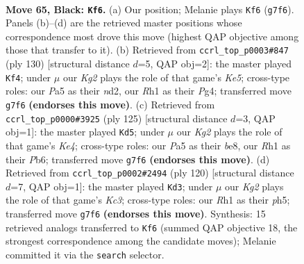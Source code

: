 \documentclass[11pt]{article}
\begin{document}
\clearpage

\begin{figure}[p]\centering
\begin{subfigure}{0.46\textwidth}\centering
\resizebox{\linewidth}{!}{%
\newchessgame
\chessboard[
  setfen={8/6k1/2p5/p2p4/8/4K3/8/7r b - - 1 65},
  showmover=false,
  pgfstyle=straightmove, color=movearrow, markmove={g7-f6}
]}
\caption{}
\end{subfigure}\hfill
\begin{subfigure}{0.46\textwidth}\centering
\resizebox{\linewidth}{!}{%
\newchessgame
\chessboard[
  setfen={8/5k2/8/4K1P1/6PP/8/3n4/8 w - - 5 66},
  showmover=false,
  pgfstyle=straightmove, color=movearrow, markmove={e5-f4}
]}
\caption{}
\end{subfigure}
\\[4pt]
\begin{subfigure}{0.46\textwidth}\centering
\resizebox{\linewidth}{!}{%
\newchessgame
\chessboard[
  setfen={4B3/8/1p6/4k1p1/7p/8/6K1/8 b - - 1 63},
  showmover=false,
  pgfstyle=straightmove, color=movearrow, markmove={e5-d5}
]}
\caption{}
\end{subfigure}\hfill
\begin{subfigure}{0.46\textwidth}\centering
\resizebox{\linewidth}{!}{%
\newchessgame
\chessboard[
  setfen={8/4k3/8/5pPp/7P/2K5/8/8 w - - 1 61},
  showmover=false,
  pgfstyle=straightmove, color=movearrow, markmove={c3-d3}
]}
\caption{}
\end{subfigure}
\caption{\textbf{Move 65, Black: \texttt{Kf6}.} (a) Our position; Melanie plays \texttt{Kf6} (\texttt{g7f6}). Panels (b)--(d) are the retrieved master positions whose correspondence most drove this move (highest QAP objective among those that transfer to it). (b) Retrieved from \texttt{ccrl\_top\_p0003\#847} (ply 130) [structural distance $d$=5, QAP obj=2]: the master played \texttt{Kf4}; under $\mu$ our \emph{Kg2} plays the role of that game's \emph{Ke5}; cross-type roles: our \emph{P}a5 as their \emph{n}d2, our \emph{R}h1 as their \emph{P}g4; transferred move \texttt{g7f6} \textbf{(endorses this move)}. (c) Retrieved from \texttt{ccrl\_top\_p0000\#3925} (ply 125) [structural distance $d$=3, QAP obj=1]: the master played \texttt{Kd5}; under $\mu$ our \emph{Kg2} plays the role of that game's \emph{Ke4}; cross-type roles: our \emph{P}a5 as their \emph{b}e8, our \emph{R}h1 as their \emph{P}b6; transferred move \texttt{g7f6} \textbf{(endorses this move)}. (d) Retrieved from \texttt{ccrl\_top\_p0002\#2494} (ply 120) [structural distance $d$=7, QAP obj=1]: the master played \texttt{Kd3}; under $\mu$ our \emph{Kg2} plays the role of that game's \emph{Kc3}; cross-type roles: our \emph{R}h1 as their \emph{p}h5; transferred move \texttt{g7f6} \textbf{(endorses this move)}. Synthesis: 15 retrieved analogs transferred to \texttt{Kf6} (summed QAP objective 18, the strongest correspondence among the candidate moves); Melanie committed it via the \texttt{search} selector.}
\label{fig:thought-m129}
\end{figure}
\end{document}

